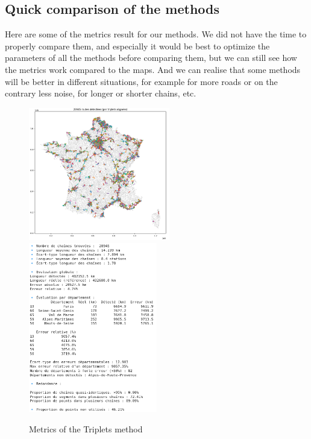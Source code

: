 \documentclass[main.tex]{subfiles}
\begin{document}
\subsection{Quick comparison of the methods}

Here are some of the metrics result for our methods. We did not have the time to properly compare them, and especially it would be best to optimize the parameters of all the methods before comparing them, but we can still see how the metrics work compared to the maps. And we can realise that some methods will be better in different situations, for example for more roads or on the contrary less noise, for longer or shorter chains, etc.

\begin{figure}[H]
    \includegraphics[width=0.55\textwidth]{Images/Res_Triplets.png}
    \includegraphics[width=0.5\textwidth]{Images/Metrics_Triplets.png}
    \caption{Metrics of the Triplets method}
\end{figure}
\end{document}
